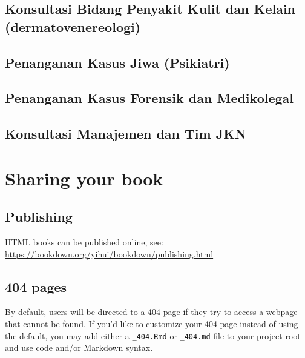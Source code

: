 \documentclass[
]{book}
\begin{document}
\hypertarget{konsultasi-bidang-penyakit-kulit-dan-kelain-dermatovenereologi}{%
\section{Konsultasi Bidang Penyakit Kulit dan Kelain (dermatovenereologi)}\label{konsultasi-bidang-penyakit-kulit-dan-kelain-dermatovenereologi}}

\hypertarget{penanganan-kasus-jiwa-psikiatri}{%
\section{Penanganan Kasus Jiwa (Psikiatri)}\label{penanganan-kasus-jiwa-psikiatri}}

\hypertarget{penanganan-kasus-forensik-dan-medikolegal}{%
\section{Penanganan Kasus Forensik dan Medikolegal}\label{penanganan-kasus-forensik-dan-medikolegal}}

\hypertarget{konsultasi-manajemen-dan-tim-jkn}{%
\section{Konsultasi Manajemen dan Tim JKN}\label{konsultasi-manajemen-dan-tim-jkn}}

\hypertarget{sharing-your-book}{%
\chapter{Sharing your book}\label{sharing-your-book}}

\hypertarget{publishing}{%
\section{Publishing}\label{publishing}}

HTML books can be published online, see: \url{https://bookdown.org/yihui/bookdown/publishing.html}

\hypertarget{pages}{%
\section{404 pages}\label{pages}}

By default, users will be directed to a 404 page if they try to access a webpage that cannot be found. If you'd like to customize your 404 page instead of using the default, you may add either a \texttt{\_404.Rmd} or \texttt{\_404.md} file to your project root and use code and/or Markdown syntax.
\end{document}
